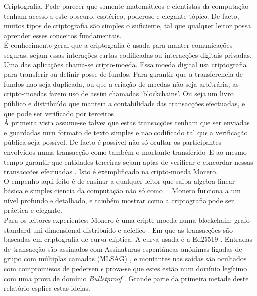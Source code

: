 Criptografia. Pode parecer que somente matemáticos e cientistas da computação tenham acesso a este obscuro, esotérico, poderoso e elegante tópico. De facto, muitos tipos de criptografia são simples o suficiente, tal que qualquer leitor possa aprender esses conceitos fundamentais.
\\ \newline
É conhecimento geral que a criptografia é usada para manter comunicações seguras, sejam essas interações cartas codificadas ou interacções digitais privadas. Uma das aplicações chama-se cripto-moeda. Essa moeda digital usa criptografia para transferir ou definir posse de fundos. Para garantir que a transferencia de fundos nao seja duplicada, ou que a criação de moedas não seja arbítrária, as cripto-moedas fazem uso de assim chamadas `blockchains'. Ou seja um livro público e distribuído que mantem a contabilidade das transacções efectuadas, e que pode ser verificado por terceiros \cite{Nakamoto_bitcoin}.
\\ \newline
Á primeira vista assume-se talvez que estas transacções tenham que ser enviadas e guardadas num formato de texto simples e nao codificado tal que a verificação pública seja possível. De facto é possível não só ocultar os participantes envolvidos numa transacção como também o montante transferido. E ao mesmo tempo garantir que entidades terceiras sejam aptas de verificar e concordar nessas transaccões efectuadas \cite{cryptoNoteWhitePaper}. Isto é exemplificado na cripto-moeda Monero.
\\ \newline
O empenho aqui feito é de ensinar a qualquer leitor que saiba algebra linear básica e simples ciencia da computação não só como   Monero funciona a um nível profundo e detalhado, e também mostrar como a criptografia pode ser práctica e elegante.
\\ \newline
Para os leitores experientes: Monero é uma cripto-moeda numa blockchain; grafo standard uni-dimensional distribuído e acíclico \cite{Nakamoto_bitcoin}. Em que as transacções são baseadas em criptografia de curva elíptica. A curva usada é a Ed25519 \cite{Bernstein2008}. Entradas de transacção são assinados com Assinaturas espontâneas anónimas ligadas de grupo com múltiplas camadas (MLSAG) \cite{MRL-0005-ringct}, e montantes nas saídas são ocultados com compromissos de pedersen \cite{maxwell-ct} e prova-se que estes estão num domínio legítimo com uma prova de domínio {\em Bulletproof} \cite{Bulletproofs_paper}. Grande parte da primeira metade deste relatório esplica estas ideias.    
